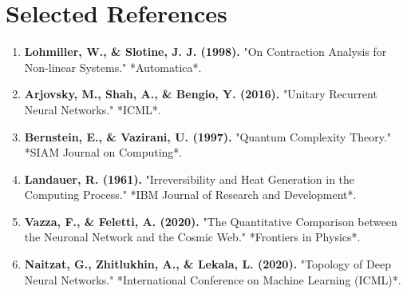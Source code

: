 \documentclass[11pt]{article}
\begin{document}
\section{Selected References}

\begin{enumerate}
    \item \textbf{Lohmiller, W., \& Slotine, J. J. (1998).} "On Contraction Analysis for Non-linear Systems." *Automatica*.
    \item \textbf{Arjovsky, M., Shah, A., \& Bengio, Y. (2016).} "Unitary Recurrent Neural Networks." *ICML*.
    \item \textbf{Bernstein, E., \& Vazirani, U. (1997).} "Quantum Complexity Theory." *SIAM Journal on Computing*.
    \item \textbf{Landauer, R. (1961).} "Irreversibility and Heat Generation in the Computing Process." *IBM Journal of Research and Development*.
    \item \textbf{Vazza, F., \& Feletti, A. (2020).} "The Quantitative Comparison between the Neuronal Network and the Cosmic Web." *Frontiers in Physics*.
    \item \textbf{Naitzat, G., Zhitlukhin, A., \& Lekala, L. (2020).} "Topology of Deep Neural Networks." *International Conference on Machine Learning (ICML)*.
\end{enumerate}
\end{document}
